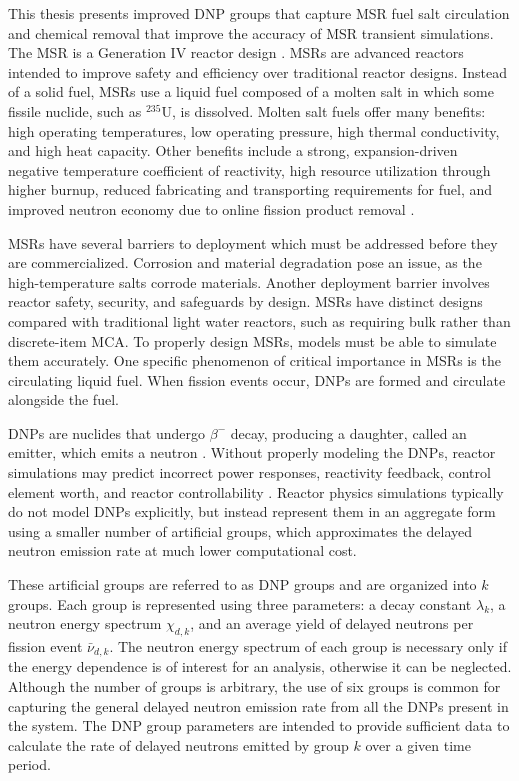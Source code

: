 
This thesis presents improved \gls{DNP} groups that capture \gls{MSR} fuel salt circulation and chemical removal that improve the accuracy of \gls{MSR} transient simulations.
The \gls{MSR} is a Generation IV reactor design \cite{kelly_generation_2014}.
\Glspl{MSR} are advanced reactors intended to improve safety and efficiency over traditional reactor designs.
Instead of a solid fuel, \glspl{MSR} use a liquid fuel composed of a molten salt in which some fissile nuclide, such as $^{235}$U, is dissolved.
Molten salt fuels offer many benefits: high operating temperatures, low operating pressure, high thermal conductivity, and high heat capacity.
Other benefits include a strong, expansion-driven negative temperature coefficient of reactivity, high resource utilization through higher burnup, reduced fabricating and transporting requirements for fuel, and improved neutron economy due to online fission product removal \cite{serp_molten_2014}.

\Glspl{MSR} have several barriers to deployment which must be addressed before they are commercialized.
Corrosion and material degradation pose an issue, as the high-temperature salts corrode materials.
Another deployment barrier involves reactor safety, security, and safeguards by design.
\Glspl{MSR} have distinct designs compared with traditional light water reactors, such as requiring bulk rather than discrete-item \gls{MCA}.
To properly design \glspl{MSR}, models must be able to simulate them accurately.
One specific phenomenon of critical importance in \glspl{MSR} is the circulating liquid fuel.
When fission events occur, \glspl{DNP} are formed and circulate alongside the fuel.

\Glspl{DNP} are nuclides that undergo $\beta^-$ decay, producing a daughter, called an emitter, which emits a neutron \cite{bank2000jef}.
Without properly modeling the \glspl{DNP}, reactor simulations may predict incorrect power responses, reactivity feedback, control element worth, and reactor controllability \cite{das1993importance, das1977kinetics, lane1958fluid}.
Reactor physics simulations typically do not model \glspl{DNP} explicitly, but instead represent them in an aggregate form using a smaller number of artificial groups, which approximates the delayed neutron emission rate at much lower computational cost.

These artificial groups are referred to as \gls{DNP} groups and are organized into $k$ groups.
Each group is represented using three parameters: a decay constant $\lambda_k$, a neutron energy spectrum $\chi_{d,k}$, and an average yield of delayed neutrons per fission event $\bar{\nu}_{d,k}$.
The neutron energy spectrum of each group is necessary only if the energy dependence is of interest for an analysis, otherwise it can be neglected.
Although the number of groups is arbitrary, the use of six groups is common for capturing the general delayed neutron emission rate from all the \glspl{DNP} present in the system.
The \gls{DNP} group parameters are intended to provide sufficient data to calculate the rate of delayed neutrons emitted by group $k$ over a given time period.

